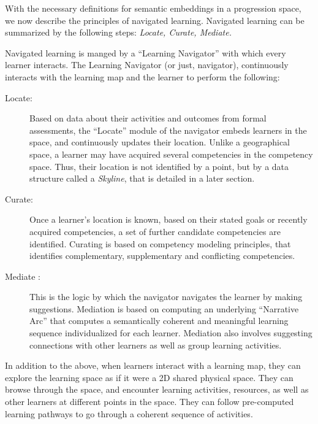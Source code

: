 \begin{multicols}{2}
With the necessary definitions for semantic embeddings in a progression space, we now describe the principles of navigated learning. Navigated learning can be summarized by the following steps: \textit{Locate, Curate, Mediate.}

Navigated learning is manged by a “Learning Navigator” with which every learner interacts. The Learning Navigator (or just, navigator), continuously interacts with the learning map and the learner to perform the following:
\begin{description}
\item[Locate:]  Based on data about their activities and outcomes from formal assessments, the “Locate” module of the navigator embeds learners in the space, and continuously updates their location. Unlike a geographical space, a learner may have acquired several competencies in the competency space. Thus, their location is not identified by a point, but by a data structure called a \textit{Skyline}, that is detailed in a later section.
\item[Curate:] Once a learner’s location is known, based on their stated goals or recently acquired competencies, a set of further candidate competencies are identified. Curating is based on competency modeling principles, that identifies complementary, supplementary and conflicting competencies.
\item[Mediate :] This is the logic by which the navigator navigates the learner by making suggestions. Mediation is based on computing an underlying “Narrative Arc” that computes a semantically coherent and meaningful learning sequence individualized for each learner. Mediation also involves suggesting connections with other learners as well as group learning activities.
\end{description}

In addition to the above, when learners interact with a learning map, they can explore the learning space as if it were a 2D shared physical space. They can browse through the space, and encounter learning activities, resources, as well as other learners at different points in the space. They can follow pre-computed learning pathways to go through a coherent sequence of activities.


\end{multicols}
